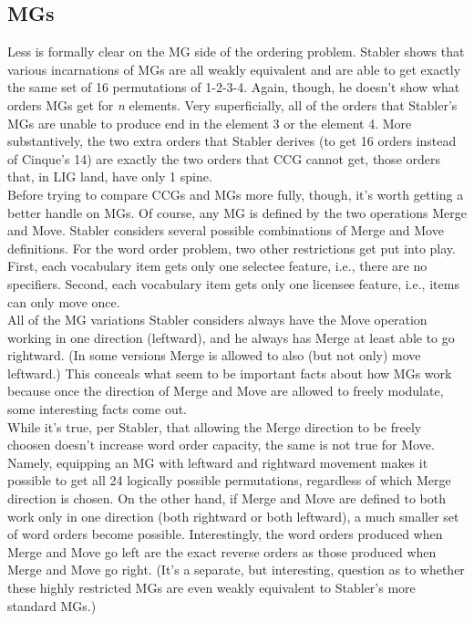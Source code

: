 \documentclass[12pt]{article}
\begin{document}
\subsection{MGs}

\noindent Less is formally clear on the MG side of the ordering problem. Stabler shows that various incarnations of MGs are all weakly equivalent and are able to get exactly the same set of 16 permutations of 1-2-3-4. Again, though, he doesn't show what orders MGs get for \textit{n} elements. Very superficially, all of the orders that Stabler's MGs are unable to produce end in the element 3 or the element 4. More substantively, the two extra orders that Stabler derives (to get 16 orders instead of Cinque's 14) are exactly the two orders that CCG cannot get, those orders that, in LIG land, have only 1 spine.\\

\noindent Before trying to compare CCGs and MGs more fully, though, it's worth getting a better handle on MGs. Of course, any MG is defined by the two operations Merge and Move. Stabler considers several possible combinations of Merge and Move definitions. For the word order problem, two other restrictions get put into play. First, each vocabulary item gets only one selectee feature, i.e., there are no specifiers. Second, each vocabulary item gets only one licensee feature, i.e., items can only move once. \\

\noindent All of the MG variations Stabler considers always have the Move operation working in one direction (leftward), and he always has Merge at least able to go rightward. (In some versions Merge is allowed to also (but not only) move leftward.) This conceals what seem to be important facts about how MGs work because once the direction of Merge and Move are allowed to freely modulate, some interesting facts come out.\\

\noindent While it's true, per Stabler, that allowing the Merge direction to be freely choosen doesn't increase word order capacity, the same is not true for Move. Namely, equipping an MG with leftward and rightward movement makes it possible to get all 24 logically possible permutations, regardless of which Merge direction is chosen. On the other hand, if Merge and Move are defined to both work only in one direction (both rightward or both leftward), a much smaller set of word orders become possible. Interestingly, the word orders produced when Merge and Move go left are the exact reverse orders as those produced when Merge and Move go right. (It's a separate, but interesting, question as to whether these highly restricted MGs are even weakly equivalent to Stabler's more standard MGs.)\\
\end{document}
